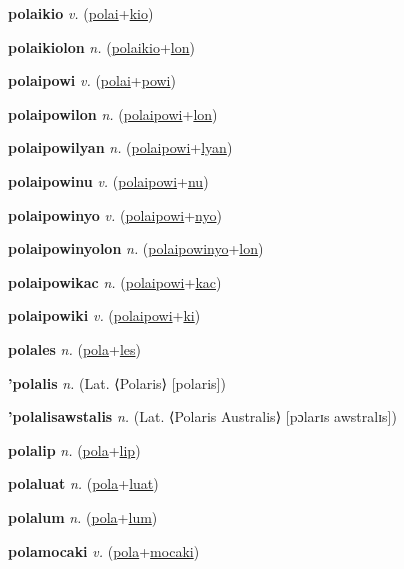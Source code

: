 \textbf{\hypertarget{polaikio}{polaikio}} \textit{v.} (\hyperlink{polai}{polai}+\allowbreak \hyperlink{kio}{kio})


\textbf{\hypertarget{polaikiolon}{polaikiolon}} \textit{n.} (\hyperlink{polaikio}{polaikio}+\allowbreak \hyperlink{lon}{lon})


\textbf{\hypertarget{polaipowi}{polaipowi}} \textit{v.} (\hyperlink{polai}{polai}+\allowbreak \hyperlink{powi}{powi})


\textbf{\hypertarget{polaipowilon}{polaipowilon}} \textit{n.} (\hyperlink{polaipowi}{polaipowi}+\allowbreak \hyperlink{lon}{lon})


\textbf{\hypertarget{polaipowilyan}{polaipowilyan}} \textit{n.} (\hyperlink{polaipowi}{polaipowi}+\allowbreak \hyperlink{lyan}{lyan})


\textbf{\hypertarget{polaipowinu}{polaipowinu}} \textit{v.} (\hyperlink{polaipowi}{polaipowi}+\allowbreak \hyperlink{nu}{nu})


\textbf{\hypertarget{polaipowinyo}{polaipowinyo}} \textit{v.} (\hyperlink{polaipowi}{polaipowi}+\allowbreak \hyperlink{nyo}{nyo})


\textbf{\hypertarget{polaipowinyolon}{polaipowinyolon}} \textit{n.} (\hyperlink{polaipowinyo}{polaipowinyo}+\allowbreak \hyperlink{lon}{lon})


\textbf{\hypertarget{polaipowikac}{polaipowikac}} \textit{n.} (\hyperlink{polaipowi}{polaipowi}+\allowbreak \hyperlink{kac}{kac})


\textbf{\hypertarget{polaipowiki}{polaipowiki}} \textit{v.} (\hyperlink{polaipowi}{polaipowi}+\allowbreak \hyperlink{ki}{ki})


\textbf{\hypertarget{polales}{polales}} \textit{n.} (\hyperlink{pola}{pola}+\allowbreak \hyperlink{les}{les})


\textbf{\hypertarget{'polalis}{'polalis}} \textit{n.} (Lat. ⟨Polaris⟩ [polaris])


\textbf{\hypertarget{'polalisawstalis}{'polalisawstalis}} \textit{n.} (Lat. ⟨Polaris Australis⟩ [pɔlarɪs awstralɪs])


\textbf{\hypertarget{polalip}{polalip}} \textit{n.} (\hyperlink{pola}{pola}+\allowbreak \hyperlink{lip}{lip})


\textbf{\hypertarget{polaluat}{polaluat}} \textit{n.} (\hyperlink{pola}{pola}+\allowbreak \hyperlink{luat}{luat})


\textbf{\hypertarget{polalum}{polalum}} \textit{n.} (\hyperlink{pola}{pola}+\allowbreak \hyperlink{lum}{lum})


\textbf{\hypertarget{polamocaki}{polamocaki}} \textit{v.} (\hyperlink{pola}{pola}+\allowbreak \hyperlink{mocaki}{mocaki})


